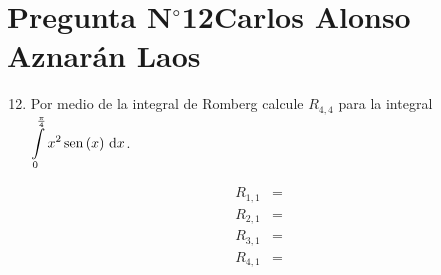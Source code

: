 \section{Pregunta N$^{\circ}$12\qquad Carlos Alonso Aznarán Laos}



\begin{frame}
    \begin{enumerate}\setcounter{enumi}{11}
        \item

              Por medio de la integral de Romberg calcule $R_{4,4}$
              para la integral
              \begin{math}
                  \displaystyle
                  \int\limits_{0}^{\frac{\pi}{4}}
                  x^{2}
                  \operatorname{sen}\left(x\right)
                  \dl x
              \end{math}.
    \end{enumerate}

    \begin{solution}

        \begin{align*}
            R_{1,1} & =
            \\
            R_{2,1} & =
            \\
            R_{3,1} & =
            \\
            R_{4,1} & =
        \end{align*}
    \end{solution}
\end{frame}